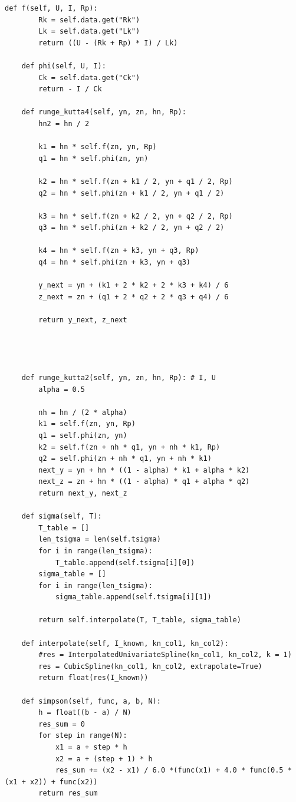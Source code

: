 \documentclass[a4paper,14pt]{article}
\begin{document}
\begin{lstlisting}[label=code1,caption=\text{Класс Modeller.}]
    def f(self, U, I, Rp):
        Rk = self.data.get("Rk")
        Lk = self.data.get("Lk")
        return ((U - (Rk + Rp) * I) / Lk)

    def phi(self, U, I):
        Ck = self.data.get("Ck")
        return - I / Ck
    
    def runge_kutta4(self, yn, zn, hn, Rp):
        hn2 = hn / 2

        k1 = hn * self.f(zn, yn, Rp)
        q1 = hn * self.phi(zn, yn)

        k2 = hn * self.f(zn + k1 / 2, yn + q1 / 2, Rp)
        q2 = hn * self.phi(zn + k1 / 2, yn + q1 / 2)
        
        k3 = hn * self.f(zn + k2 / 2, yn + q2 / 2, Rp)
        q3 = hn * self.phi(zn + k2 / 2, yn + q2 / 2)

        k4 = hn * self.f(zn + k3, yn + q3, Rp)
        q4 = hn * self.phi(zn + k3, yn + q3)

        y_next = yn + (k1 + 2 * k2 + 2 * k3 + k4) / 6
        z_next = zn + (q1 + 2 * q2 + 2 * q3 + q4) / 6

        return y_next, z_next




    def runge_kutta2(self, yn, zn, hn, Rp): # I, U
        alpha = 0.5

        nh = hn / (2 * alpha)
        k1 = self.f(zn, yn, Rp)
        q1 = self.phi(zn, yn)
        k2 = self.f(zn + nh * q1, yn + nh * k1, Rp)
        q2 = self.phi(zn + nh * q1, yn + nh * k1)
        next_y = yn + hn * ((1 - alpha) * k1 + alpha * k2)
        next_z = zn + hn * ((1 - alpha) * q1 + alpha * q2)
        return next_y, next_z

    def sigma(self, T):
        T_table = []
        len_tsigma = len(self.tsigma)
        for i in range(len_tsigma):
            T_table.append(self.tsigma[i][0])
        sigma_table = []
        for i in range(len_tsigma):
            sigma_table.append(self.tsigma[i][1])
        
        return self.interpolate(T, T_table, sigma_table)
    
    def interpolate(self, I_known, kn_col1, kn_col2):
        #res = InterpolatedUnivariateSpline(kn_col1, kn_col2, k = 1)
        res = CubicSpline(kn_col1, kn_col2, extrapolate=True)
        return float(res(I_known))
    
    def simpson(self, func, a, b, N):
        h = float((b - a) / N)
        res_sum = 0
        for step in range(N):
            x1 = a + step * h
            x2 = a + (step + 1) * h
            res_sum += (x2 - x1) / 6.0 *(func(x1) + 4.0 * func(0.5 * (x1 + x2)) + func(x2))
        return res_sum

\end{lstlisting}
\end{document}
